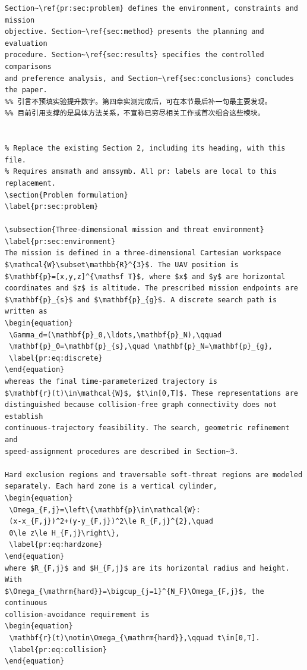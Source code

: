 \documentclass[12pt]{article}
\begin{document}
\begin{verbatim}
Section~\ref{pr:sec:problem} defines the environment, constraints and mission
objective. Section~\ref{sec:method} presents the planning and evaluation
procedure. Section~\ref{sec:results} specifies the controlled comparisons
and preference analysis, and Section~\ref{sec:conclusions} concludes the paper.
%% 引言不预填实验提升数字。第四章实测完成后，可在本节最后补一句最主要发现。
%% 目前引用支撑的是具体方法关系，不宣称已穷尽相关工作或首次组合这些模块。


% Replace the existing Section 2, including its heading, with this file.
% Requires amsmath and amssymb. All pr: labels are local to this replacement.
\section{Problem formulation}
\label{pr:sec:problem}

\subsection{Three-dimensional mission and threat environment}
\label{pr:sec:environment}
The mission is defined in a three-dimensional Cartesian workspace
$\mathcal{W}\subset\mathbb{R}^{3}$. The UAV position is
$\mathbf{p}=[x,y,z]^{\mathsf T}$, where $x$ and $y$ are horizontal
coordinates and $z$ is altitude. The prescribed mission endpoints are
$\mathbf{p}_{s}$ and $\mathbf{p}_{g}$. A discrete search path is written as
\begin{equation}
 \Gamma_d=(\mathbf{p}_0,\ldots,\mathbf{p}_N),\qquad
 \mathbf{p}_0=\mathbf{p}_{s},\quad \mathbf{p}_N=\mathbf{p}_{g},
 \label{pr:eq:discrete}
\end{equation}
whereas the final time-parameterized trajectory is
$\mathbf{r}(t)\in\mathcal{W}$, $t\in[0,T]$. These representations are
distinguished because collision-free graph connectivity does not establish
continuous-trajectory feasibility. The search, geometric refinement and
speed-assignment procedures are described in Section~3.

Hard exclusion regions and traversable soft-threat regions are modeled
separately. Each hard zone is a vertical cylinder,
\begin{equation}
 \Omega_{F,j}=\left\{\mathbf{p}\in\mathcal{W}:
 (x-x_{F,j})^2+(y-y_{F,j})^2\le R_{F,j}^{2},\quad
 0\le z\le H_{F,j}\right\},
 \label{pr:eq:hardzone}
\end{equation}
where $R_{F,j}$ and $H_{F,j}$ are its horizontal radius and height. With
$\Omega_{\mathrm{hard}}=\bigcup_{j=1}^{N_F}\Omega_{F,j}$, the continuous
collision-avoidance requirement is
\begin{equation}
 \mathbf{r}(t)\notin\Omega_{\mathrm{hard}},\qquad t\in[0,T].
 \label{pr:eq:collision}
\end{equation}


\end{verbatim}
\end{document}
